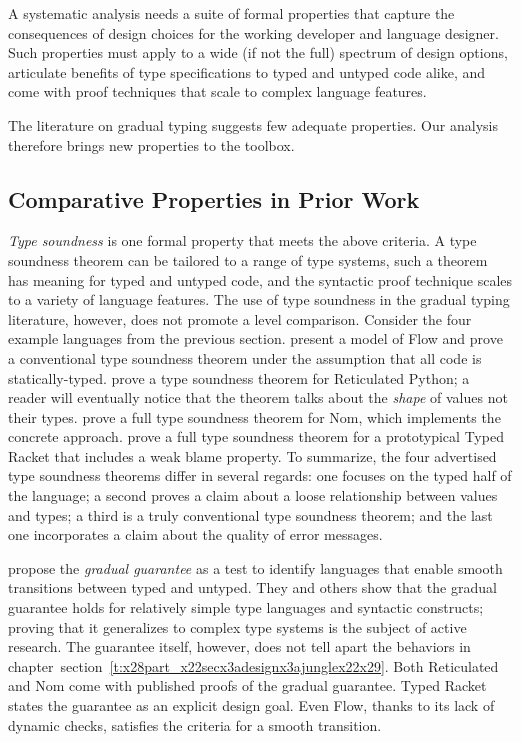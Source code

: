 \documentclass[ twoside,open=right,titlepage,numbers=noenddot,headinclude,%
                footinclude=true,cleardoublepage=empty,abstract=off,
                BCOR=5mm,paper=a4,fontsize=11pt,%
                ngerman,american,%
                parts,pdfspacing]{scrreprt}
\newcommand{\SecRef}[2]{section~#1}
\newcommand{\SecRefLocal}[3]{\hyperref[#1]{\SecRef{#2}{#3}}}
\newcommand{\Ssubsubsection}[2]{\subsubsection[#1]{#2}}
\renewcommand{\Ssubsubsection}[2]{\subsection[#1]{#2}}
\renewcommand{\SecRefLocal}[3]{section~\ref{#1}}
\begin{document}
A systematic analysis needs a suite of formal properties that capture the
consequences of design choices for the working developer and language designer.
Such properties must
    apply to a wide (if not the full) spectrum of design options,
    articulate benefits of type specifications to typed and untyped code alike, and
    come with proof techniques that scale to complex language features.

\noindent{}The literature on gradual typing suggests few adequate properties.
Our analysis therefore brings new properties to the toolbox.

\Ssubsubsection{Comparative Properties in Prior Work}{Comparative Properties in Prior Work}\label{t:x28part_x22secx3adesignx3aoldx2dpropertiesx22x29}

\emph{Type soundness} is one formal property that meets the above criteria.
A type soundness theorem can be tailored to a range of type systems,
 such a theorem has meaning for typed and untyped code,
 and the syntactic proof technique scales to a variety of language features.
The use of type soundness in the gradual typing literature, however, does not
 promote a level comparison.
Consider the four example languages from the previous section.
 present a model of Flow and prove a conventional
 type soundness theorem under the assumption that all code is statically{-}typed.
 prove a type soundness theorem for Reticulated Python;
 a reader will eventually notice that the theorem talks about the \emph{shape}
 of values not their types.
 prove a full type soundness theorem for Nom,
 which implements the concrete approach.
 prove a full type soundness theorem for a prototypical
 Typed Racket that includes a weak blame property.
To summarize, the four advertised type soundness theorems differ in several
regards:  one focuses on the typed half of the language;
 a second proves a claim about a loose relationship between values and types;
 a third is a truly conventional type soundness theorem;
 and the last one incorporates a claim about the quality of error messages.

 propose the \emph{gradual guarantee} as a test to
 identify languages that enable smooth transitions between typed and
 untyped. They and others show that the gradual guarantee holds for
 relatively simple type languages and syntactic constructs; proving that it
 generalizes to complex type systems is the subject of active
 research.
 The guarantee itself, however, does not tell apart the behaviors in chapter~\SecRefLocal{t:x28part_x22secx3adesignx3ajunglex22x29}{4.2}{Assorted Behaviors by Example}.
Both Reticulated and Nom come with published proofs of the gradual
 guarantee.
Typed Racket states the guarantee as an explicit design goal.
Even Flow, thanks to its lack of dynamic checks, satisfies the criteria for
 a smooth transition.
\end{document}
